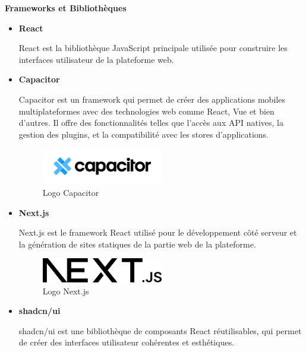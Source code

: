 \textbf{Frameworks et Bibliothèques}
\begin{itemize}
  \item \textbf{React}

    React est la bibliothèque JavaScript principale utilisée pour construire
    les interfaces utilisateur de la plateforme web.

  \item \textbf{Capacitor}

    Capacitor est un framework qui permet de créer des applications mobiles
    multiplateformes avec des technologies web comme React,  Vue et bien d'autres.
    Il offre des fonctionnalités telles que l'accès aux API natives, la gestion
    des plugins, et la compatibilité avec les stores d'applications.

    \begin{figure}[H]
      \centering
      \includegraphics[width=0.5\textwidth]{images/Capacitor-JS-2375506976.png}
      \caption{Logo Capacitor}
    \end{figure}

  \item \textbf{Next.js}

    Next.js est le framework React utilisé pour le développement côté serveur
    et la génération de sites statiques de la partie web de la plateforme.

    \begin{figure}[H]
      \centering
      \includegraphics[width=0.5\textwidth]{images/Nextjs-logo.svg.png}
      \caption{Logo Next.js}
    \end{figure}

  \item \textbf{shadcn/ui}

    shadcn/ui est une bibliothèque de composants React réutilisables, qui
    permet de créer des interfaces utilisateur cohérentes et esthétiques.
\end{itemize}

